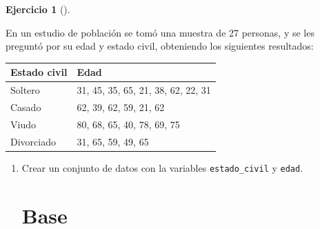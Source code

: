 \documentclass[
  spanish,
  a4paper,
]{scrreport}
\theoremstyle{definition}
\newtheorem{exercise}{Ejercicio}[chapter]
\theoremstyle{remark}
\begin{document}
\begin{exercise}[]\protect\hypertarget{exr-frecuencias-graficos-estado-civil-edades}{}\label{exr-frecuencias-graficos-estado-civil-edades}

En un estudio de población se tomó una muestra de 27 personas, y se les
preguntó por su edad y estado civil, obteniendo los siguientes
resultados:

\begin{longtable}[]{@{}ll@{}}
\toprule\noalign{}
Estado civil & Edad \\
\midrule\noalign{}
\endhead
\bottomrule\noalign{}
\endlastfoot
Soltero & 31, 45, 35, 65, 21, 38, 62, 22, 31 \\
Casado & 62, 39, 62, 59, 21, 62 \\
Viudo & 80, 68, 65, 40, 78, 69, 75 \\
Divorciado & 31, 65, 59, 49, 65 \\
\end{longtable}

\begin{enumerate}
\def\labelenumi{\alph{enumi}.}
\item
  Crear un conjunto de datos con la variables \texttt{estado\_civil} y
  \texttt{edad}.

  \begin{tcolorbox}[enhanced jigsaw, breakable, leftrule=.75mm, toptitle=1mm, rightrule=.15mm, opacitybacktitle=0.6, left=2mm, colframe=quarto-callout-tip-color-frame, titlerule=0mm, toprule=.15mm, opacityback=0, bottomtitle=1mm, coltitle=black, colbacktitle=quarto-callout-tip-color!10!white, title=\textcolor{quarto-callout-tip-color}{\faLightbulb}\hspace{0.5em}{Solución}, arc=.35mm, bottomrule=.15mm, colback=white]

  \section{Base}


\end{tcolorbox}
\end{enumerate}
\end{exercise}
\end{document}
